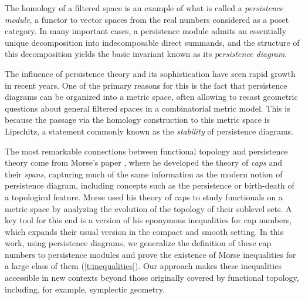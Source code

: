 The homology of a filtered space is an example of what is called a \textit{persistence module}, a functor to vector spaces from the real numbers considered as a poset category.
In many important cases, a persistence module admits an essentially unique decomposition into indecomposable direct summands, and the structure of this decomposition yields the basic invariant known as its \textit{persistence diagram}.

The influence of persistence theory and its sophistication have seen rapid growth in recent years.
One of the primary reasons for this is the fact that persistence diagrams can be organized into a metric space, often allowing to recast geometric questions about general filtered spaces in a combinatorial metric model.
This is because the passage via the homology construction to this metric space is Lipschitz, a statement commonly known as the \textit{stability} of persistence diagrams.

The most remarkable connections between functional topology and persistence theory come from Morse's paper \cite{Morse.1940}, where he developed the theory of \textit{caps} and their \textit{spans}, capturing much of the same information as the modern notion of persistence diagram, including concepts such as the persistence or birth-death of a topological feature.
Morse used his theory of caps to study functionals on a metric space by analyzing the evolution of the topology of their sublevel sets.
A key tool for this end is a version of his eponymous inequalities for cap numbers, which expands their usual version in the compact and smooth setting.
In this work, using persistence diagrams, we generalize  the definition of these cap numbers to persistence modules and prove the existence of Morse inequalities for a large class of them (\cref{t:inequalities}).
Our approach makes these inequalities accessible in new contexts beyond those originally covered by functional topology, including, for example, symplectic geometry.

